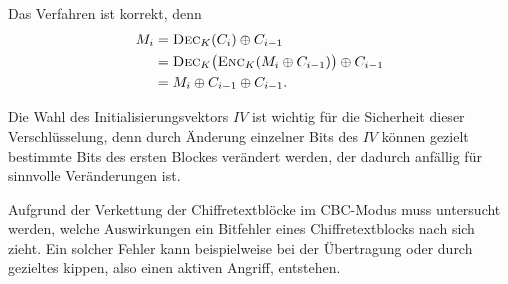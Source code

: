 Das Verfahren ist korrekt, denn
\begin{align*}
	\begin{split}
		M_i &= \textsc{Dec}_{K}(C_i)\oplus C_{i-1}\\
		&= \textsc{Dec}_{K} \bigl(\textsc{Enc}_{K}(M_i\oplus C_{i-1})\bigr) \oplus C_{i-1}\\
		&= M_i\oplus C_{i-1}\oplus C_{i-1}.
	\end{split}
\end{align*}

Die Wahl des Initialisierungsvektors $IV$ ist wichtig für die Sicherheit dieser Verschlüsselung, denn durch Änderung einzelner Bits des $IV$ können gezielt
bestimmte Bits des ersten Blockes verändert werden, der dadurch anfällig für sinnvolle Veränderungen ist.

Aufgrund der Verkettung der Chiffretextblöcke im CBC-Modus muss untersucht werden, welche Auswirkungen ein Bitfehler eines Chiffretextblocks nach sich zieht.
Ein solcher Fehler kann beispielweise bei der Übertragung oder durch gezieltes kippen, also einen aktiven Angriff, entstehen.

